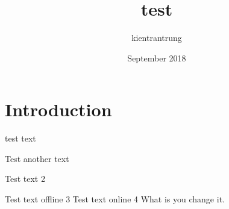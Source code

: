 \documentclass{article}
\title{test}
\author{kientrantrung }
\date{September 2018}
\begin{document}
\maketitle

\section{Introduction}
test text

Test another text

Test text 2

Test text offline 3
Test text online 4
What is you change it.
\end{document}

